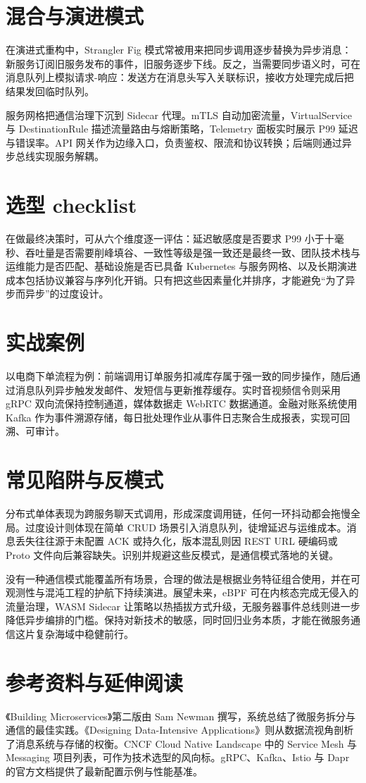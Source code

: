 \chapter{混合与演进模式}
在演进式重构中，Strangler Fig 模式常被用来把同步调用逐步替换为异步消息：新服务订阅旧服务发布的事件，旧服务逐步下线。反之，当需要同步语义时，可在消息队列上模拟请求-响应：发送方在消息头写入关联标识，接收方处理完成后把结果发回临时队列。\par
服务网格把通信治理下沉到 Sidecar 代理。mTLS 自动加密流量，VirtualService 与 DestinationRule 描述流量路由与熔断策略，Telemetry 面板实时展示 P99 延迟与错误率。API 网关作为边缘入口，负责鉴权、限流和协议转换；后端则通过异步总线实现服务解耦。\par
\chapter{选型 checklist}
在做最终决策时，可从六个维度逐一评估：延迟敏感度是否要求 P99 小于十毫秒、吞吐量是否需要削峰填谷、一致性等级是强一致还是最终一致、团队技术栈与运维能力是否匹配、基础设施是否已具备 Kubernetes 与服务网格、以及长期演进成本包括协议兼容与序列化开销。只有把这些因素量化并排序，才能避免“为了异步而异步”的过度设计。\par
\chapter{实战案例}
以电商下单流程为例：前端调用订单服务扣减库存属于强一致的同步操作，随后通过消息队列异步触发发邮件、发短信与更新推荐缓存。实时音视频信令则采用 gRPC 双向流保持控制通道，媒体数据走 WebRTC 数据通道。金融对账系统使用 Kafka 作为事件溯源存储，每日批处理作业从事件日志聚合生成报表，实现可回溯、可审计。\par
\chapter{常见陷阱与反模式}
分布式单体表现为跨服务聊天式调用，形成深度调用链，任何一环抖动都会拖慢全局。过度设计则体现在简单 CRUD 场景引入消息队列，徒增延迟与运维成本。消息丢失往往源于未配置 ACK 或持久化，版本混乱则因 REST URL 硬编码或 Proto 文件向后兼容缺失。识别并规避这些反模式，是通信模式落地的关键。\par
没有一种通信模式能覆盖所有场景，合理的做法是根据业务特征组合使用，并在可观测性与混沌工程的护航下持续演进。展望未来，eBPF 可在内核态完成无侵入的流量治理，WASM Sidecar 让策略以热插拔方式升级，无服务器事件总线则进一步降低异步编排的门槛。保持对新技术的敏感，同时回归业务本质，才能在微服务通信这片复杂海域中稳健前行。\par
\chapter{参考资料与延伸阅读}
《Building Microservices》第二版由 Sam Newman 撰写，系统总结了微服务拆分与通信的最佳实践。《Designing Data-Intensive Applications》则从数据流视角剖析了消息系统与存储的权衡。CNCF Cloud Native Landscape 中的 Service Mesh 与 Messaging 项目列表，可作为技术选型的风向标。gRPC、Kafka、Istio 与 Dapr 的官方文档提供了最新配置示例与性能基准。\par
